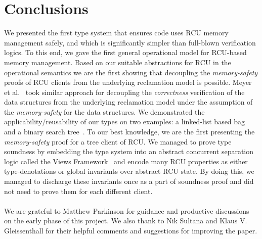 \section{Conclusions}
\label{sec:concls}
We presented the first type system that ensures code uses RCU memory management safely, and which is significantly simpler than full-blown verification logics. To this end, we gave the first general operational model for RCU-based memory management. Based on our suitable abstractions for RCU in the operational semantics we are the first showing that decoupling the \textit{memory-safety} proofs of RCU clients from the underlying reclamation model is possible. Meyer et al.~\cite{myr} took similar approach for decoupling the \textit{correctness} verification of the data structures from the underlying reclamation model under the assumption of the \textit{memory-safety} for the data structures. We demonstrated the applicability/reusability of our types on two examples: a linked-list based bag~\cite{McKenney2015SomeEO} and a binary search tree~\cite{Arbel:2014:CUR:2611462.2611471}. To our best knowledge, we are the first presenting the \textit{memory-safety} proof for a tree client of RCU. We managed to prove type soundness by embedding the type system into an abstract concurrent separation logic called the Views Framework~\cite{views} and encode many RCU properties as either type-denotations or global invariants over abstract RCU state. By doing this, we managed to discharge these invariants once as a part of soundness proof and did not need to prove them for each different client.
\paragraph{}
 We are grateful to Matthew Parkinson for guidance and productive discussions on the early phase of this project. We also thank to Nik Sultana and Klaus V. Gleissenthall for their helpful comments and suggestions for improving the paper.
